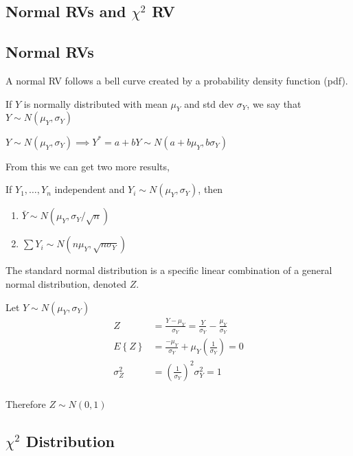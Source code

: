 \documentclass[10pt]{article}
\newcommand{\define}[1]{\colorbox{Thistle2}{#1}}
\newcommand{\emphas}[1]{\colorbox{DarkSeaGreen2}{#1}}
\newcommand{\mean}[1]{\mu_{#1}}
\renewcommand{\exp}[1]{E\left\{#1\right\}} %
\newcommand{\sigvar}[1]{\sigma^2_{#1}} %
\newcommand{\sigdev}[1]{\sigma_{#1}}
\begin{document}
\begin{multicols}{3}
    \section{Normal RVs and \texorpdfstring{$\chi^2$}{X2} RV} %

    \subsection{Normal RVs}

    A normal RV follows a bell curve created by a \emphas{probability density function (pdf)}.

    If $Y$ is normally distributed with mean $\mean{Y}$ and std dev $\sigdev{Y}$, we say that $Y \sim N(\mean{Y}, \sigdev{Y})$

    $Y \sim N(\mean{Y}, \sigdev{Y}) \implies Y^* = a + bY \sim N(a + b\mean{Y}, b\sigdev{Y})$

    From this we can get two more results,

    If $Y_1, \dots, Y_n$ independent and $Y_i \sim N(\mean{Y}, \sigdev{Y})$, then

    \begin{enumerate}
        \item $\bar Y \sim N(\mean{Y}, \sigdev{Y}/\sqrt{n})$
        \item $\sum Y_i \sim N(n \mean{Y}, \sqrt{n \sigdev{Y}})$
    \end{enumerate}

    The \define{standard normal distribution} is a specific linear combination of a general normal distribution, denoted $Z$.

    Let $Y \sim N(\mean{Y}, \sigdev{Y})$
    \begin{align*}
        Z          & = \frac{Y - \mean{Y}}{\sigdev{Y}} = \frac{Y}{\sigdev{Y}} - \frac{\mean{Y}}{\sigdev{Y}} \\
        \exp{Z}    & = \frac{-\mean{Y}}{\sigdev{Y}} + \mean{Y} (\frac{1}{\sigdev{Y}}) = 0                   \\
        \sigvar{Z} & = \left(\frac{1}{\sigdev{Y}}\right)^2 \sigvar{Y} = 1                                   \\
    \end{align*}

    Therefore $Z \sim N(0,1)$

    \subsection{\texorpdfstring{$\chi^2$}{chi2} Distribution}


\end{multicols}
\end{document}
